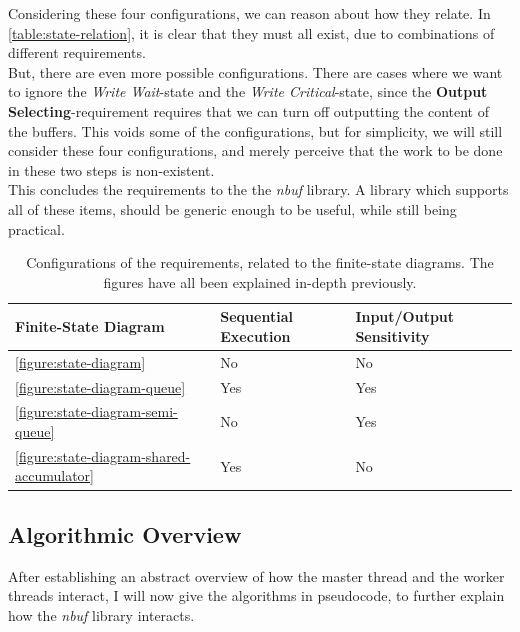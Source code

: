 \documentclass[a4paper]{article}
\newcommand{\nbuf}{\textit{nbuf} }
\begin{document}
Considering these four configurations, we can reason about how they relate. In \autoref{table:state-relation}, it is clear that they must all exist, due to combinations of different requirements.\\

But, there are even more possible configurations. There are cases where we want to ignore the \textit{Write Wait}-state and the \textit{Write Critical}-state, since the \textbf{Output Selecting}-requirement requires that we can turn off outputting the content of the buffers. This voids some of the configurations, but for simplicity, we will still consider these four configurations, and merely perceive that the work to be done in these two steps is non-existent.\\

This concludes the requirements to the the \nbuf library. A library which supports all of these items, should be generic enough to be useful, while still being practical.

\begin{table}[]
\begin{adjustwidth}{-0.5in}{-0.5in}
\centering
\begin{tabular}{@{}lll@{}}
\toprule
\textbf{Finite-State Diagram}                     & \textbf{Sequential Execution} & \textbf{Input/Output Sensitivity} \\ \midrule
\autoref{figure:state-diagram}                    & No                            & No                                \\ \midrule
\autoref{figure:state-diagram-queue}              & Yes                           & Yes                               \\ \midrule
\autoref{figure:state-diagram-semi-queue}         & No                            & Yes                               \\ \midrule
\autoref{figure:state-diagram-shared-accumulator} & Yes                           & No                                \\ \bottomrule
\end{tabular}
\caption{Configurations of the requirements, related to the finite-state diagrams. The figures have all been explained in-depth previously.}
\label{table:state-relation}
\end{adjustwidth}
\end{table}




\newpage
\subsection{Algorithmic Overview}
After establishing an abstract overview of how the master thread and the worker threads interact, I will now give the algorithms in pseudocode, to further explain how the \nbuf library interacts.\\
\end{document}
